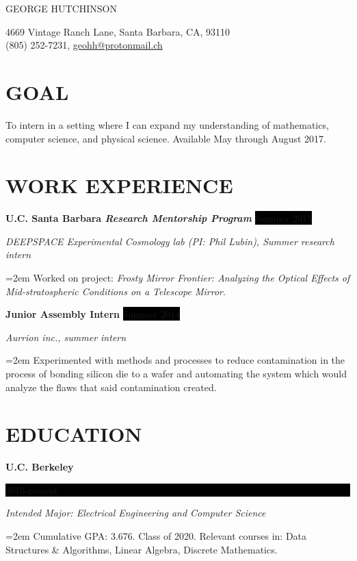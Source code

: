 \documentclass[paper=a4,fontsize=11pt]{scrartcl} %
\newlength{\spacebox}
\newcommand{\sepspace}{\vspace*{1em}}		%
\newcommand{\MyName}[1]{ %
		\Huge \usefont{OT1}{phv}{b}{n} \hfill #1
		\par \normalsize \normalfont}
\newcommand{\MySlogan}[1]{ %
		\large \usefont{OT1}{phv}{m}{n}\hfill #1
		\par \normalsize \normalfont}
\newcommand{\NewPart}[1]{\section*{\uppercase{#1}}}
\newcommand{\PersonalEntry}[2]{
		\noindent\hangindent=2em\hangafter=0 %
		\parbox{\spacebox}{        %
		\textit{#1}}		       %
		\hspace{1.5em} #2 \par}    %
\newcommand{\EducationEntry}[4]{
		\noindent \textbf{#1} \hfill      %
		\colorbox{Black}{%
			\parbox{6em}{%
			\hfill\color{White}#2}} \par  %
		\noindent \textit{#3} \par        %
		\noindent\hangindent=2em\hangafter=0 \small #4 %
		\normalsize \par}
\newcommand{\WorkEntry}[4]{				  %
		\noindent \textbf{#1} \hfill      %
		\colorbox{Black}{\color{White}#2} \par  %
		\noindent \textit{#3} \par              %
		\noindent\hangindent=2em\hangafter=0 \small #4 %
		\normalsize \par}
\begin{document}

\MyName{GEORGE HUTCHINSON}
\MySlogan{4669 Vintage Ranch Lane, Santa Barbara, CA, 93110\\\hspace*{\fill}(805) 252-7231, \url{geohh@protonmail.ch}}


%

\label{GOAL}
\NewPart{Goal}

To intern in a setting where I can expand my understanding of mathematics, computer science, and physical science.
Available May through August 2017.

\label{WORK}

\NewPart{Work experience}{}

\WorkEntry{U.C. Santa Barbara \textit{Research Mentorship Program}}{Summer 2015}{DEEPSPACE Experimental Cosmology lab (PI: Phil Lubin), Summer research intern}{Worked on project: \textit{Frosty Mirror Frontier: Analyzing the Optical Effects of Mid-stratospheric Conditions on a Telescope Mirror}.}
\sepspace

\WorkEntry{Junior Assembly Intern}{Summer 2014}{Aurrion inc., summer intern}{Experimented with methods and processes to reduce contamination in the process of bonding silicon die to a wafer and automating the system which would analyze the flaws that said contamination created.}

\label{EDU}
\NewPart{Education}{}

\EducationEntry{U.C. Berkeley}{2016-present}{Intended Major: Electrical Engineering and Computer Science}{Cumulative GPA: 3.676. Class of 2020. Relevant courses in: Data Structures \& Algorithms, Linear Algebra, Discrete Mathematics.}
\sepspace
\end{document}
